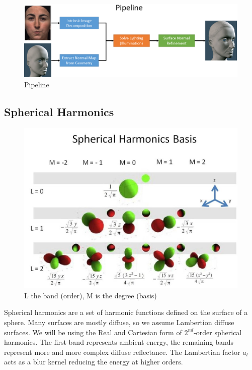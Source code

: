 \documentclass[10pt,twocolumn,letterpaper]{article}
\begin{document}
\begin{figure}[t]
    \begin{center}
        \includegraphics [scale=0.7] {image/pipeline.png}
    \end{center}
    \caption{Pipeline}
    \label{fig:pipe1}
\end{figure} 
\subsection{Spherical Harmonics}
\begin{figure}[h]
    \begin{center}
        \includegraphics [scale=0.5] {image/sh_basis.jpg}
    \end{center}
    \caption{L the band (order), M is the degree (basis)}
    \label{fig:sh-basis}
\end{figure} 
Spherical harmonics are a set of harmonic functions defined on the surface of a sphere. Many surfaces are mostly diffuse, so we assume Lambertion diffuse surfaces. We will be using the Real and Cartesian form of $2^{nd}$-order spherical harmonics. The first band represents ambient energy, the remaining bands represent more and more complex diffuse reflectance. The Lambertian factor $a_l$ acts as a blur kernel reducing the energy at higher orders. \par
\end{document}
